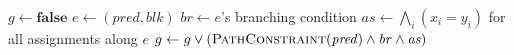 \begin{algorithmic}
\State $g \gets \textbf{false}$
\State $e \gets (\mathit{pred},\mathit{blk})$
	\State $\mathit{br} \gets e$'s branching condition
	\State $\mathit{as} \gets \bigwedge_i(x_i = y_i)$ for all assignments along $e$
	\State $g \gets g \lor (\Call{PathConstraint}{\mathit{pred}} \land \mathit{br} \land \mathit{as})$
\EndIf
\EndFor
\State {}
\EndFunction
\end{algorithmic}
